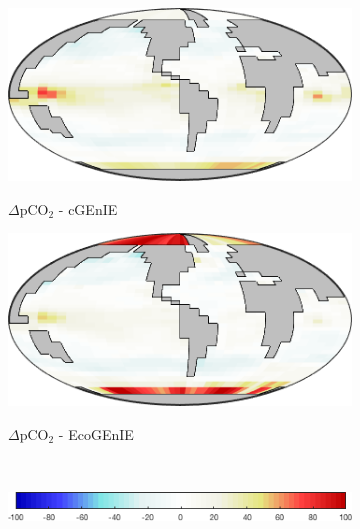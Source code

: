 \documentclass{article}
\begin{document}
\begin{figure}[htp]
 \centering
\begin{subfigure}{.33\textwidth}
 \caption{$\Delta$pCO$_2$ - cGEnIE}
 \includegraphics[width=0.95\linewidth]{../separate_figures/BIOGEM/atm_dpCO2.png}
 \label{fig:dpCO2_1}
\end{subfigure}%
\begin{subfigure}{.33\textwidth}
 \caption{$\Delta$pCO$_2$ - EcoGEnIE}
 \includegraphics[width=0.95\linewidth]{../separate_figures/ECOGEM/atm_dpCO2.png}
 \label{fig:dpCO2_2}
\end{subfigure}
\\[+0.2cm]
\begin{subfigure}{.5\textwidth}
 \includegraphics[width=0.95\linewidth]{../separate_figures/ECOGEM/atm_dpCO2_clrbr.png}
\end{subfigure}
\end{figure}
\end{document}
